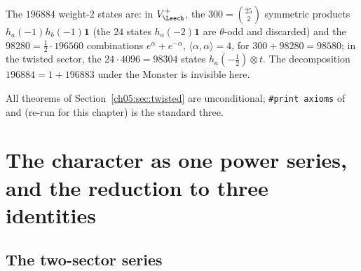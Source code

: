 \begin{remark}
The $196884$ weight-$2$ states are: in $V_\Leech^+$, the $300 = \binom{25}{2}$ symmetric products
$h_a(-1)h_b(-1)\mathbf 1$ (the $24$ states $h_a(-2)\mathbf1$ are $\theta$-odd and discarded) and the
$98280 = \tfrac12\cdot196560$ combinations $e^\alpha + e^{-\alpha}$, $\langle\alpha,\alpha\rangle = 4$, for
$300 + 98280 = 98580$; in the twisted sector, the $24\cdot4096 = 98304$ states $h_a(-\tfrac12)\otimes t$.
The decomposition $196884 = 1 + 196883$ under the Monster is invisible here.
\end{remark}

\begin{status}
All theorems of Section~\ref{ch05:sec:twisted} are unconditional; \texttt{\#print axioms} of
 and  (re-run for this chapter) is the standard
three.
\end{status}

\section{The character as one power series, and the reduction to three identities}\label{ch05:sec:series}

\subsection{The two-sector series}


